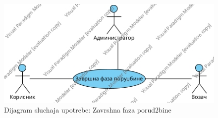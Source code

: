 \begin{figure}[h!]
	\includegraphics[scale=0.5]{Slike/SUzavrsnaFazaPorudzbineUse Case Diagram.jpg}
	\centering
	\caption{Dijagram sluchaja upotrebe: Zavrshna faza porud2bine}
	\label{ucZavrsnaFaza}
\end{figure}

\newpage

